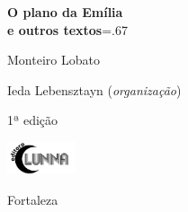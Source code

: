 




\begingroup\thispagestyle{empty}\vspace*{-.01\textheight}\parindent=0pt 
              \formular
              \Huge 
              \textbf{O plano da Emília\\ e outros textos}\baselineskip=.67\baselineskip 

              \vspace{15mm}
              
              \LARGE
              Monteiro Lobato
              
              \vspace{5cm}

              \newfontfamily{}
              {\selectfont\minion\small
              Ieda Lebensztayn (\textit{organização})}
              
              {\selectfont\minion\footnotesize
              1ª edição}
                    
              \vfill

              \includegraphics[width=2cm]{../logolunna.png}

              {\selectfont\minion\small
              Fortaleza \quad\the\year}
\endgroup

\pagebreak